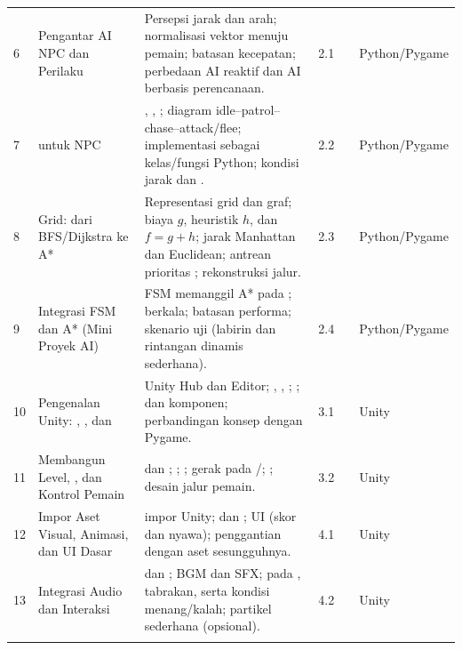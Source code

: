 \begin{landscape}
{\begin{longtable}{@{}L{1.3cm} L{4.4cm} L{11.5cm} L{2.1cm} L{1.7cm} L{2.6cm}@{}}
6 & Pengantar AI NPC dan Perilaku  &
Persepsi jarak dan arah; normalisasi vektor menuju pemain; batasan kecepatan; perbedaan AI reaktif dan AI berbasis perencanaan. &
2.1 &  & Python/Pygame \\
\addlinespace

7 &  untuk NPC &
, , ; diagram idle--patrol--chase--attack/flee; implementasi sebagai kelas/fungsi Python; kondisi jarak dan . &
2.2 &  & Python/Pygame \\
\addlinespace

8 &  Grid: dari BFS/Dijkstra ke A* &
Representasi grid dan graf; biaya $g$, heuristik $h$, dan $f = g + h$; jarak Manhattan dan Euclidean; antrean prioritas ; rekonstruksi jalur. &
2.3 &  & Python/Pygame \\
\addlinespace

9 & Integrasi FSM dan A* (Mini Proyek AI) &
FSM memanggil A* pada ;  berkala; batasan performa; skenario uji (labirin dan rintangan dinamis sederhana). &
2.4 &  & Python/Pygame \\
\addlinespace

10 & Pengenalan Unity: , , dan  &
Unity Hub dan Editor; , , ; ;  dan komponen; perbandingan konsep dengan Pygame. &
3.1 &  & Unity \\
\addlinespace

11 & Membangun Level, , dan Kontrol Pemain &
 dan ; ; ;  gerak pada /; ; desain jalur pemain. &
3.2 &  & Unity \\
\addlinespace

12 & Impor Aset Visual, Animasi, dan UI Dasar &
 impor Unity;  dan ;  UI (skor dan nyawa); penggantian  dengan aset sesungguhnya. &
4.1 &  & Unity \\
\addlinespace

13 & Integrasi Audio dan  Interaksi &
 dan ; BGM dan SFX;  pada , tabrakan, serta kondisi menang/kalah; partikel sederhana (opsional). &
4.2 &  & Unity \\
\addlinespace


\end{longtable}}
\end{landscape}

